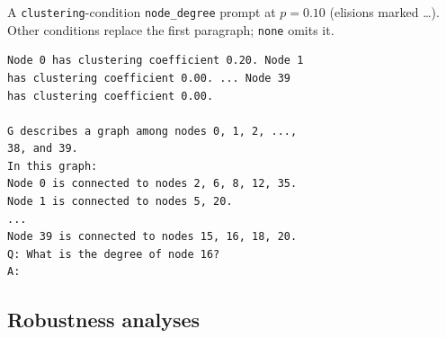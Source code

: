 \documentclass[11pt]{article}
\begin{document}
A \texttt{clustering}-condition \texttt{node\_degree} prompt at $p{=}0.10$
(elisions marked \dots). Other conditions replace the first paragraph;
\texttt{none} omits it.

{\scriptsize
\begin{verbatim}
Node 0 has clustering coefficient 0.20. Node 1
has clustering coefficient 0.00. ... Node 39
has clustering coefficient 0.00.

G describes a graph among nodes 0, 1, 2, ...,
38, and 39.
In this graph:
Node 0 is connected to nodes 2, 6, 8, 12, 35.
Node 1 is connected to nodes 5, 20.
...
Node 39 is connected to nodes 15, 16, 18, 20.
Q: What is the degree of node 16?
A:
\end{verbatim}
}

\subsection{Robustness analyses}

\begin{table}[H]
\centering
\footnotesize
\setlength{\tabcolsep}{3.2pt}
\caption{Shortcut bars on $500$ graphs from the published $5$--$19$-node
generator, used for the held-out arms. At $n{=}40$
(Table~\ref{tab:shortcut}) the \texttt{edge\_existence}/\texttt{none} bar
rises to $0.735$ through class imbalance, and \texttt{degree}'s gap over
\texttt{none} on that task falls from $+0.296$ to $+0.011$.}
\label{tab:shortcut-published}
\end{table}
\end{document}
